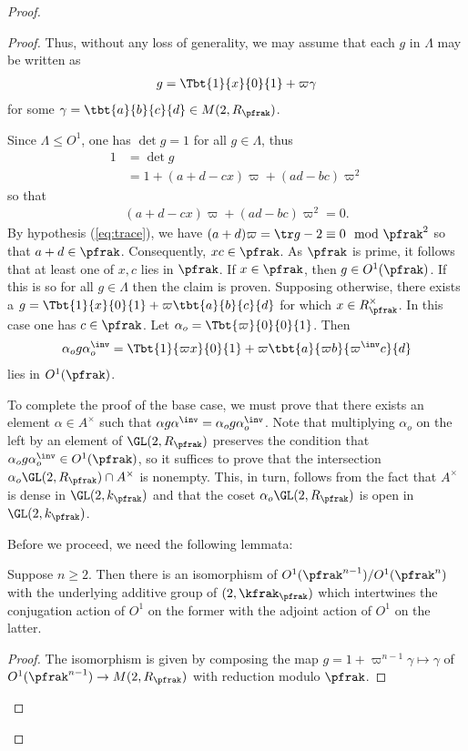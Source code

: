 \begin{proof}
\begin{proof}
    Thus, without any loss of generality, we may assume that each $g$ in $\Lambda$ may be written as
    \begin{align*}
      g = \Tbt{1}{x}{0}{1} + \varpi \gamma
    \end{align*}
    for some $\gamma = \tbt{a}{b}{c}{d} \in M(2, R_\pfrak)$.

    Since $\Lambda \leq O^1$, one has $\det g = 1 $ for all $g\in \Lambda$, thus
    \begin{align*}
      1 & = \det g                                     \\
        & = 1 + (a+d - cx ) \varpi + (ad -bc) \varpi^2
    \end{align*}
    so that
    \begin{align}\label{eq:MandarinLeyden}
      (a+d - cx) \varpi + (ad-bc) \varpi^2 =0.
    \end{align}
    By hypothesis (\ref{eq:trace}), we have $(a+d)\varpi = \tr g -2 \equiv 0 \mod \pfrak^2$ so that $a+d \in \pfrak$. Consequently, $xc \in \pfrak$. As $\pfrak$ is prime, it follows that at least one of $x,c$ lies in $\pfrak$. If $x \in \pfrak$, then $g \in O^1(\pfrak)$. If this is so for all $g \in \Lambda$ then the claim is proven. Supposing otherwise, there exists a $ g = \Tbt{1}{x}{0}{1} + \varpi \tbt{a}{b}{c}{d}$ for which $x \in R_\pfrak^\times$. In this case one has $c \in \pfrak$. Let $\alpha_o = \Tbt{\varpi}{0}{0}{1}$. Then
    \begin{align*}
      \alpha_o g\alpha_o^\inv  = \Tbt{1}{\varpi x}{0}{1} + \varpi \tbt{a}{\varpi b}{\varpi^\inv c}{d}
    \end{align*}
    lies in $O^1(\pfrak)$.

    To complete the proof of the base case, we must prove that there exists an element $\alpha \in A^\times $ such that $\alpha g \alpha^\inv =  \alpha_o g \alpha_o^\inv$. Note that multiplying $\alpha_o$ on the left by an element of $\GL(2,R_\pfrak)$ preserves the condition that $\alpha_o g \alpha_o^\inv \in O^1(\pfrak)$, so it suffices to prove that the intersection $\alpha_o \GL(2,R_\pfrak) \cap A^\times $ is nonempty. This, in turn, follows from the fact that $A^\times$ is dense in $\GL(2,k_\pfrak)$ and that the coset  $\alpha_o \GL(2,R_\pfrak)$ is open in $\GL(2,k_\pfrak)$.

    Before we proceed, we need the following lemmata:
    \begin{lemma}\label{lemma:iso}
      Suppose $n\geq 2$. Then there is an isomorphism of $O^1(\pfrak^{n-1}) / O^1(\pfrak^{n})$ with the underlying additive group of $\sl(2,\kfrak_\pfrak)$ which intertwines the conjugation action of $O^1$ on the former with the adjoint action of $O^1$ on the latter.
    \end{lemma}
    \begin{proof}
      The isomorphism is given by composing the map $g = 1 + \varpi^{n-1}\gamma \mapsto \gamma$  of $O^1(\pfrak^{n-1}) \to M(2,R_\pfrak)$ with reduction modulo $\pfrak$.
    \end{proof}


\end{proof}
\end{proof}
